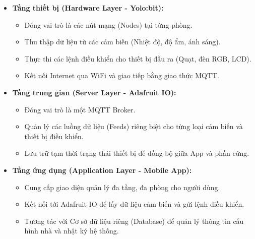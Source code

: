 \begin{itemize}
    \item \textbf{Tầng thiết bị (Hardware Layer - Yolo:bit):}
    \begin{itemize}
        \item Đóng vai trò là các nút mạng (Nodes) tại từng phòng.
        \item Thu thập dữ liệu từ các cảm biến (Nhiệt độ, độ ẩm, ánh sáng).
        \item Thực thi các lệnh điều khiển cho thiết bị đầu ra (Quạt, đèn RGB, LCD).
        \item Kết nối Internet qua WiFi và giao tiếp bằng giao thức MQTT.
    \end{itemize}
    
    \item \textbf{Tầng trung gian (Server Layer - Adafruit IO):}
    \begin{itemize}
        \item Đóng vai trò là một MQTT Broker.
        \item Quản lý các luồng dữ liệu (Feeds) riêng biệt cho từng loại cảm biến và thiết bị điều khiển.
        \item Lưu trữ tạm thời trạng thái thiết bị để đồng bộ giữa App và phần cứng.
    \end{itemize}

    \item \textbf{Tầng ứng dụng (Application Layer - Mobile App):}
    \begin{itemize}
        \item Cung cấp giao diện quản lý đa tầng, đa phòng cho người dùng.
        \item Kết nối tới Adafruit IO để lấy dữ liệu cảm biến và gửi lệnh điều khiển.
        \item Tương tác với Cơ sở dữ liệu riêng (Database) để quản lý thông tin cấu hình nhà và nhật ký hệ thống.
    \end{itemize}
\end{itemize}

